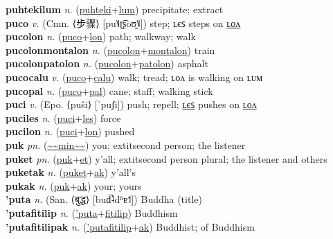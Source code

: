 \textbf{puhtekilum} \textit{n.} (\hyperref[puhteki]{puhteki}+\hyperref[lum]{lum})
precipitate; extract \label{puhtekilum} \\
\textbf{puco} \textit{v.} (Cmn. ⟨步骤⟩ [pu˥˩ʈ͡ʂoʊ̯˥˩])
step; ʟєꜱ steps on \hyperref[pucolon]{ʟᴏᴧ} \label{puco} \\
\textbf{pucolon} \textit{n.} (\hyperref[puco]{puco}+\hyperref[lon]{lon})
path; walkway; walk \label{pucolon} \\
\textbf{pucolonmontalon} \textit{n.} (\hyperref[pucolon]{pucolon}+\hyperref[montalon]{montalon})
train \label{pucolonmontalon} \\
\textbf{pucolonpatolon} \textit{n.} (\hyperref[pucolon]{pucolon}+\hyperref[patolon]{patolon})
asphalt \label{pucolonpatolon} \\
\textbf{pucocalu} \textit{v.} (\hyperref[puco]{puco}+\hyperref[calu]{calu})
walk; tread; ʟᴏᴧ is walking on ʟᴜᴍ \label{pucocalu} \\
\textbf{pucopal} \textit{n.} (\hyperref[puco]{puco}+\hyperref[pal]{pal})
cane; staff; walking stick \label{pucopal} \\
\textbf{puci} \textit{v.} (Epo. ⟨puŝi⟩ [ˈpuʃi])
push; repell; \hyperref[puciles]{ʟєꜱ} pushes on \hyperref[pucilon]{ʟᴏᴧ} \label{puci} \\
\textbf{puciles} \textit{n.} (\hyperref[puci]{puci}+\hyperref[les]{les})
force \label{puciles} \\
\textbf{pucilon} \textit{n.} (\hyperref[puci]{puci}+\hyperref[lon]{lon})
pushed \label{pucilon} \\
\textbf{puk} \textit{pn.} (\hyperref[min]{\~{}\~{}min\~{}\~{}})
you; 	extit{second person}; the listener \label{puk} \\
\textbf{puket} \textit{pn.} (\hyperref[puk]{puk}+\hyperref[et]{et})
y'all; 	extit{second person plural}; the listener and others \label{puket} \\
\textbf{puketak} \textit{n.} (\hyperref[puket]{puket}+\hyperref[ak]{ak})
y'all's \label{puketak} \\
\textbf{pukak} \textit{n.} (\hyperref[puk]{puk}+\hyperref[ak]{ak})
your; yours \label{pukak} \\
\textbf{'puta} \textit{n.} (San. ⟨बुद्ध⟩ [bud̚˨dʱɐ˦])
Buddha (title) \label{'puta} \\
\textbf{'putafitilip} \textit{n.} (\hyperref['puta]{'puta}+\hyperref[fitilip]{fitilip})
Buddhism \label{'putafitilip} \\
\textbf{'putafitilipak} \textit{n.} (\hyperref['putafitilip]{'putafitilip}+\hyperref[ak]{ak})
Buddhist; of Buddhism \label{'putafitilipak} \\
